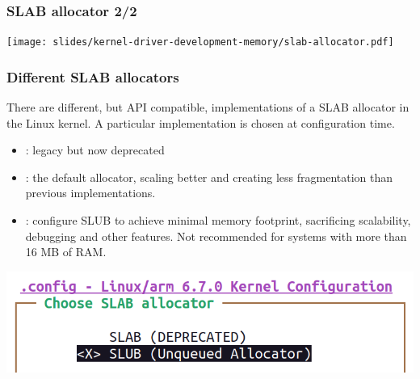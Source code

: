 \begin{frame}
  \frametitle{SLAB allocator 2/2}
  \begin{center}
    \texttt{[image: slides/kernel-driver-development-memory/slab-allocator.pdf]}
  \end{center}
\end{frame}

\begin{frame}[fragile]
  \frametitle{Different SLAB allocators}
  \small
  There are different, but API compatible, implementations of
  a SLAB allocator in the Linux kernel. A particular implementation
  is chosen at configuration time.
  \begin{itemize}
  \item {}: legacy but now deprecated
  \item {}: the default allocator, scaling better and creating less
        fragmentation than previous implementations.
  \item {}: configure SLUB to achieve minimal memory
	footprint, sacrificing scalability, debugging and other
        features. Not recommended for systems with more than 16 MB of RAM.
  \end{itemize}
  \begin{center}
    \includegraphics[height=0.2\textheight]{slides/kernel-driver-development-memory/slab-screenshot.png}
  \end{center}
\end{frame}

